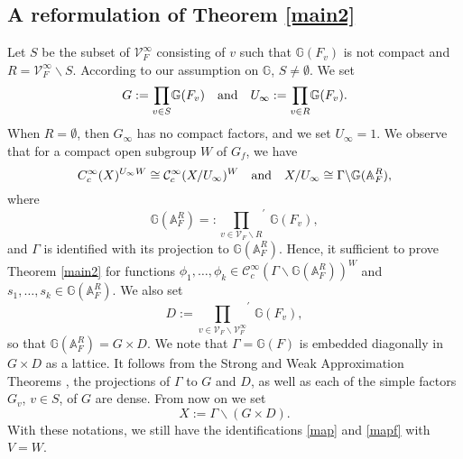 \documentclass[11pt,reqno,a4paper]{amsart}
\numberwithin{equation}{section}
\newcommand{\cC}{\mathcal{C}}
\newcommand{\bA}{\mathbb{A}}
\newcommand{\bG}{\mathbb{G}}
\theoremstyle{theorem}
\theoremstyle{definition}
\begin{document}



\subsection{A reformulation of Theorem \ref{main2}}

Let $S$ be the subset of $\mathcal{V}_F^\infty$ 
consisting of $v$ such that $\bG(F_v)$ is not compact and $R=\mathcal{V}_F^\infty\backslash S$.
According to our assumption on $\bG$, $S\ne \emptyset$.
We set 
$$
G:={\prod_{v\in S}} \bG(F_v)\quad\hbox{and}\quad
U_\infty :={\prod_{v\in R}} \bG(F_v).
$$
When $R=\emptyset$, then $G_\infty$ has no compact factors, and we set $U_\infty=1$.
We observe that for a compact open subgroup $W$ of $G_f$, we have 
$$
C_c^\infty(X)^{U_\infty W}\cong \cC^\infty_c(X/U_\infty)^W\quad
\hbox{and}\quad X/U_\infty\cong \Gamma\backslash
\bG(\bA_F^R),
$$
where
$$
\bG(\bA_F^R)=:
{\prod_{v\in\mathcal{V}_F\backslash R}}^{\!\!\!\!\!\!\prime}\, \bG(F_v),
$$
and $\Gamma$ is identified with its projection to $\bG(\bA_F^R)$.
Hence, it sufficient to prove Theorem \ref{main2} for functions 
$\phi_1,\ldots,\phi_k\in \cC^\infty_c(\Gamma\backslash \bG(\bA_F^R))^W$
and $s_1,\ldots,s_k\in \bG(\bA_F^R)$.
We also set
$$
D:={\prod_{v\in\mathcal{V}_F\backslash \mathcal{V}^\infty_F}}^{\!\!\!\!\!\!\!\!\!\prime}\, \bG(F_v),
$$
so that $\bG(\bA^R_F)=G\times D$.
We note that $\Gamma=\bG(F)$ is embedded  diagonally in $G\times D$
as a lattice. 
It follows from the Strong and Weak Approximation Theorems \cite[Ch.~7]{PR},
the projections of $\Gamma$ to $G$ and $D$, as well as each of the simple factors $G_v$, $v\in S$,
of $G$ are dense. From now on we set
$$
X:=\Gamma\backslash (G\times D).
$$
With these notations, we still have the identifications \eqref{map} and \eqref{mapf}
with $V=W$.
\end{document}
